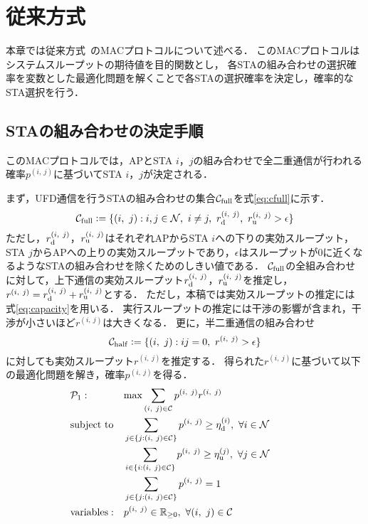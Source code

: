 \documentclass[technicalreport]{ieicej}
\newcommand{\sij}{(i,\ j)}
\newcommand{\pij}{p^{(i,\ j)}}
\newcommand{\rd}{r^{\sij}_{\rm d}}
\newcommand{\ru}{r^{\sij}_{\rm u}}
\newcommand{\rij}{r^{\sij}}
\def\coloneqq{\mathrel{\mathop:}=}
\begin{document}
\section{従来方式}
	本章では従来方式~\cite{promac}のMACプロトコルについて述べる．
	このMACプロトコルはシステムスループットの期待値を目的関数とし，
	各STAの組み合わせの選択確率を変数とした最適化問題を解くことで各STAの選択確率を決定し，確率的なSTA選択を行う．
	\subsection{STAの組み合わせの決定手順}\label{sec:promac}
		このMACプロトコルでは，APとSTA $i$，$j$の組み合わせで全二重通信が行われる確率$\pij$に基づいてSTA $i$，$j$が決定される．
		\par
		まず，UFD通信を行うSTAの組み合わせの集合${\mathcal C}_{\rm full}$を式\eqref{eq:cfull}に示す．
		\begin{equation}
			{\mathcal C}_{\rm full} \coloneqq \{\sij : i,j\in{\mathcal N},\ i\neq j,\ r^{\sij}_{\rm d},\ r^{\sij}_{\rm u}>\epsilon\} \label{eq:cfull}
		\end{equation}
		ただし，$r_{\rm d}^{\sij}$，$r_{\rm u}^{\sij}$はそれぞれAPからSTA $i$への下りの実効スループット，
		STA $j$からAPへの上りの実効スループットであり，$\epsilon$はスループットが0に近くなるようなSTAの組み合わせを除くためのしきい値である．
		${\mathcal C}_{\rm full}$の全組み合わせに対して，上下通信の実効スループット$\rd$，$\ru$を推定し，$\rij=\rd + \ru$とする．
		ただし，本稿では実効スループットの推定には式\eqref{eq:capacity}を用いる．
		実行スループットの推定には干渉の影響が含まれ，干渉が小さいほど$\rij$は大きくなる．
		更に，半二重通信の組み合わせ
		\begin{equation}
			{\mathcal C}_{\rm half} \coloneqq \{\sij : ij=0,\ \rij >\epsilon\}
		\end{equation}
		に対しても実効スループット$\rij$を推定する．
		得られた$\rij$に基づいて以下の最適化問題を解き，確率$\pij$を得る．
		\begin{align}
			&{\mathcal P}_1: && {\rm max} \sum_{(i,\ j)\in{\mathcal C}} p^{(i,\ j)}r^{(i,\ j)} &&&&&& \label{eq:p1}\\
			&{\rm subject\ to} && \sum_{j\in\{j:(i,\ j)\in{\mathcal C}\}} p^{(i,\ j)} \geq \eta_{\rm d}^{(i)},\ \forall i\in {\mathcal N}  \\
			&&& \sum_{i\in\{i:(i,\ j)\in{\mathcal C}\}} p^{(i,\ j)} \geq \eta_{\rm u}^{(j)},\ \forall j\in {\mathcal N} \label{eq:pu}\\
			&&& \sum_{j\in\{j:(i,\ j)\in{\mathcal C}\}} p^{(i,\ j)}=1 \\
			&{\rm variables:} &&p^{(i,\ j)} \in {\mathbb R}_{\geq 0},\ \forall(i,\ j)\in {\mathcal C} \nonumber
		\end{align}
\end{document}
